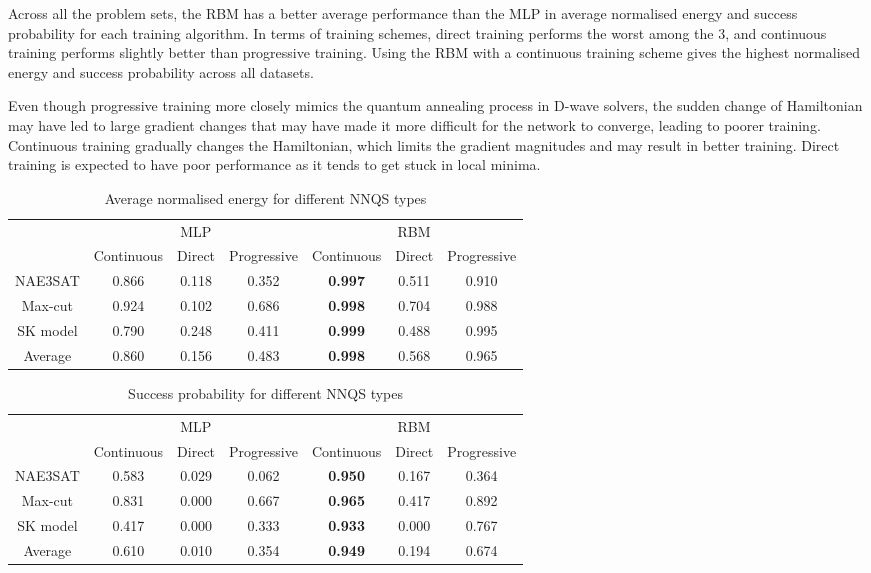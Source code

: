 Across all the problem sets, the RBM has a better average performance than the MLP in average normalised energy and success probability for each training algorithm. In terms of training schemes, direct training performs the worst among the 3, and continuous training performs slightly better than progressive training. Using the RBM with a continuous training scheme gives the highest normalised energy and success probability across all datasets. 

Even though progressive training more closely mimics the quantum annealing process in D-wave solvers, the sudden change of Hamiltonian may have led to large gradient changes that may have made it more difficult for the network to converge, leading to poorer training. Continuous training gradually changes the Hamiltonian, which limits the gradient magnitudes and may result in better training. Direct training is expected to have poor performance as it tends to get stuck in local minima.


\begin{table}[!ht]
    \centering
    \begin{tabular}{ccccccc} \toprule
        ~ & \multicolumn{3}{c}{MLP} & \multicolumn{3}{c}{RBM} \\
        \cmidrule{2-7} & Continuous & Direct & Progressive & Continuous & Direct & Progressive \\
        \midrule
        NAE3SAT & 0.866 & 0.118 & 0.352 & \textbf{0.997} & 0.511 & 0.910 \\
        Max-cut & 0.924 & 0.102 & 0.686 & \textbf{0.998} & 0.704 & 0.988 \\
        SK model & 0.790 & 0.248 & 0.411 & \textbf{0.999} & 0.488 & 0.995 \\ \midrule
        Average & 0.860 & 0.156 & 0.483 & \textbf{0.998} & 0.568 & 0.965 \\ \bottomrule
    \end{tabular}
    \caption{Average normalised energy for different NNQS types}
    \label{results:nnqsnormalizedenergy}
\end{table}

\begin{table}[!ht]
    \centering
    \begin{tabular}{ccccccc} \toprule
        ~ & \multicolumn{3}{c}{MLP} & \multicolumn{3}{c}{RBM} \\
        \cmidrule{2-7} & Continuous & Direct & Progressive & Continuous & Direct & Progressive \\
        \midrule
        NAE3SAT & 0.583 & 0.029 & 0.062 & \textbf{0.950} & 0.167 & 0.364 \\
        Max-cut & 0.831 & 0.000 & 0.667 & \textbf{0.965} & 0.417 & 0.892 \\
        SK model & 0.417 & 0.000 & 0.333 & \textbf{0.933} & 0.000 & 0.767 \\ \midrule
        Average & 0.610 & 0.010 & 0.354 & \textbf{0.949} & 0.194 & 0.674 \\ \bottomrule
    \end{tabular}
    \caption{Success probability for different NNQS types}
    \label{results:nnqssuccess}
\end{table}